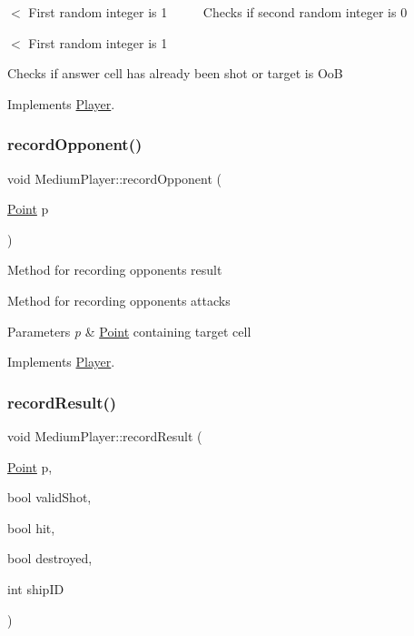 $<$ First random integer is 1 ~\newline
~\newline
~\newline
 Checks if second random integer is 0

$<$ First random integer is 1

Checks if answer cell has already been shot or target is OoB 

Implements \mbox{\hyperlink{class_player_a2cc7a83d11158eafd8d49d4b9f23ce56}{Player}}.

\mbox{\label{class_medium_player_a6183d4a8fe3d68419afcfa9e33cd5928}} 
\subsubsection{\texorpdfstring{record\+Opponent()}{recordOpponent()}}
{\footnotesize\ttfamily void Medium\+Player\+::record\+Opponent (\begin{DoxyParamCaption}\item[{\mbox{\hyperlink{class_point}{Point}}}]{p }\end{DoxyParamCaption})\hspace{0.3cm}{\ttfamily [virtual]}}

Method for recording opponent\textquotesingle{}s result

Method for recording opponent\textquotesingle{}s attacks 
\begin{DoxyParams}{Parameters}
{\em p} & \mbox{\hyperlink{class_point}{Point}} containing target cell \\
\hline
\end{DoxyParams}


Implements \mbox{\hyperlink{class_player_a768e14edee61e208e6fd295cdd72a49c}{Player}}.

\mbox{\label{class_medium_player_aeadd8498cba5c447afbb5a0eb7408285}} 
\subsubsection{\texorpdfstring{record\+Result()}{recordResult()}}
{\footnotesize\ttfamily void Medium\+Player\+::record\+Result (\begin{DoxyParamCaption}\item[{\mbox{\hyperlink{class_point}{Point}}}]{p,  }\item[{bool}]{valid\+Shot,  }\item[{bool}]{hit,  }\item[{bool}]{destroyed,  }\item[{int}]{ship\+ID }\end{DoxyParamCaption})\hspace{0.3cm}{\ttfamily [virtual]}}



